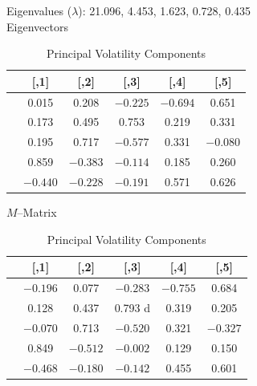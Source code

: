 	\begin{table}[H]
	\centering
	\caption{Principal Volatility Components \label{tab:pvctable}}
	Eigenvalues ($\lambda$): 21.096, 4.453, 1.623, 0.728, 0.435 \\
	
	Eigenvectors
	
	\begin{tabular}{| l | c | c | c | c | c |} \hline
        &    [,1]   &    [,2]    &   [,3]    &   [,4]   &     [,5] \\ \hline
	[1,] & 0.015 & 0.208 & $-0.225$ & $-0.694$ &  0.651 \\ \hline
	[2,] & 0.173 & 0.495 & 0.753 & 0.219 & 0.331 \\ \hline
	[3,] & 0.195 & 0.717 & $-0.577$ & 0.331 & $-0.080$ \\ \hline
	[4,] & 0.859 & $-0.383$ & $-0.114$ & 0.185 & 0.260 \\ \hline
	[5,] & $-0.440$ & $-0.228$ & $-0.191$ & 0.571 & 0.626 \\
	\end{tabular}
	
	$M$--Matrix \\[0.1cm]
	
	\begin{tabular}{| l | c | c | c | c | c |} \hline
	         &   [,1]   &     [,2]    &     [,3]   &    [,4]   &    [,5] \\ \hline
	[1,] & $-0.196$ & 0.077 & $-0.283$ & $-0.755$ & 0.684 \\ \hline
	[2,] & 0.128 & 0.437 & 0.793 d & 0.319 & 0.205 \\ \hline
	[3,]& $-0.070$ & 0.713 & $-0.520$ & 0.321 & $-0.327$ \\ \hline
	[4,] & 0.849 & $-0.512$ & $-0.002$ & 0.129 & 0.150 \\ \hline
	[5,] & $-0.468$ & $-0.180$ & $-0.142$ & 0.455 & 0.601 \\
	\end{tabular}
	\end{table}